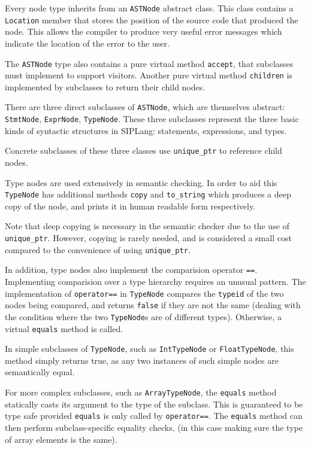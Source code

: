 \documentclass[11pt,a4paper]{scrartcl}
\begin{document}
Every node type inherits from an \verb!ASTNode! abstract class. This class contains a \verb!Location! member that stores the position of the source code that produced the node. This allows the compiler to produce very useful error messages which indicate the location of the error to the user.

The \verb!ASTNode! type also contains a pure virtual method \verb!accept!, that subclasses must implement to support visitors. Another pure virtual method \verb!children! is implemented by subclasses to return their child nodes.

There are three direct subclasses of \verb!ASTNode!, which are themselves abstract: \verb!StmtNode!, \verb!ExprNode!, \verb!TypeNode!. These three subclasses represent the three basic kinds of syntactic structures in SIPLang: statements, expressions, and types.

Concrete subclasses of these three classes use \verb!unique_ptr! to reference child nodes.

Type nodes are used extensively in semantic checking. In order to aid this \verb!TypeNode! has additional methods \verb!copy! and \verb!to_string! which produces a deep copy of the node, and prints it in human readable form respectively.

Note that deep copying is necessary in the semantic checker due to the use of \verb!unique_ptr!. However, copying is rarely needed, and is considered a small cost compared to the convenience of using \verb!unique_ptr!.

In addition, type nodes also implement the comparision operator \verb!==!. Implementing comparision over a type hierarchy requires an unusual pattern. The implementation of \verb!operator==! in \verb!TypeNode! compares the \verb!typeid! of the two nodes being compared, and returns \verb!false! if they are not the same (dealing with the condition where the two \verb!TypeNode!s are of different types). Otherwise, a virtual \verb!equals! method is called.

In simple subclasses of \verb!TypeNode!, such as \verb!IntTypeNode! or \verb!FloatTypeNode!, this method simply returns true, as any two instances of such simple nodes are semantically equal.

For more complex subclasses, such as \verb!ArrayTypeNode!, the \verb!equals! method statically casts its argument to the type of the subclass. This is guaranteed to be type safe provided \verb!equals! is only called by \verb!operator==!. The \verb!equals! method can then perform subclass-specific equality checks, (in this case making sure the type of array elements is the same).
\end{document}
